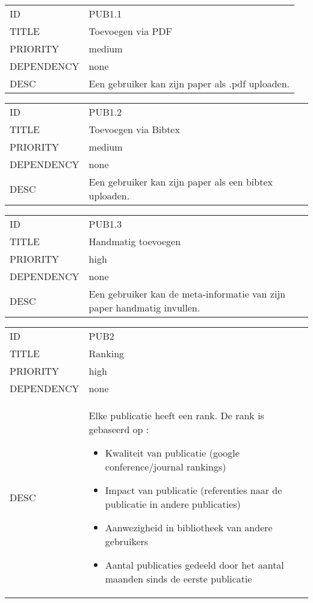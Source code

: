 \begin{longtable}{lp{10cm}}
ID           & PUB1.1\\
TITLE        & Toevoegen via PDF\\
PRIORITY     & medium\\
DEPENDENCY   & none\\
DESC         & Een gebruiker kan zijn paper als .pdf uploaden.     
\end{longtable}

\begin{longtable}{lp{10cm}}
ID           & PUB1.2\\
TITLE        & Toevoegen via Bibtex\\
PRIORITY     & medium\\
DEPENDENCY   & none\\
DESC         & Een gebruiker kan zijn paper als een bibtex uploaden.     
\end{longtable}

\begin{longtable}{lp{10cm}}
ID           & PUB1.3\\
TITLE        & Handmatig toevoegen\\
PRIORITY     & high\\
DEPENDENCY   & none\\
DESC         & Een gebruiker kan de meta-informatie van zijn paper handmatig invullen.     
\end{longtable}

\begin{longtable}{lp{10cm}}
ID           & PUB2\\
TITLE        & Ranking\\
PRIORITY     & high\\
DEPENDENCY   & none\\
DESC         & Elke publicatie heeft een rank.
De rank is gebaseerd op :
\begin{itemize}
\item Kwaliteit van publicatie (google conference/journal rankings)
\item Impact van publicatie (referenties naar de publicatie in andere publicaties)
\item Aanwezigheid in bibliotheek van andere gebruikers
\item Aantal publicaties gedeeld door het aantal maanden sinds de eerste publicatie
\end{itemize}     
\end{longtable}

